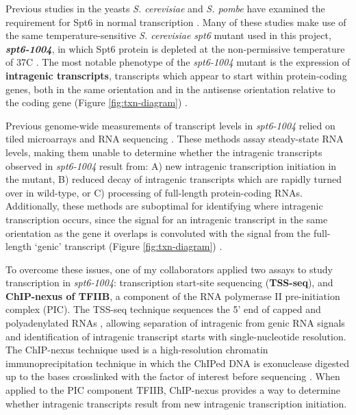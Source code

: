 \documentclass[9pt, letterpaper]{article}
\begin{document}
Previous studies in the yeasts \textit{S. cerevisiae} and \textit{S. pombe} have examined the requirement for Spt6 in normal transcription \cite{cheung2008, degennaro2013, kaplan2003, pathak2018, uwimana2017, vanbakel2013}. Many of these studies make use of the same temperature-sensitive \textit{S. cerevisiae} \textit{spt6} mutant used in this project, \textbf{\textit{spt6-1004}}, in which Spt6 protein is depleted at the non-permissive temperature of 37\textdegree C \cite{kaplan2003}. The most notable phenotype of the \textit{spt6-1004} mutant is the expression of \textbf{intragenic transcripts}, transcripts which appear to start within protein-coding genes, both in the same orientation and in the antisense orientation relative to the coding gene (Figure \ref{fig:txn-diagram}) \cite{cheung2008, degennaro2013, kaplan2003, uwimana2017}.

Previous genome-wide measurements of transcript levels in \textit{spt6-1004} relied on tiled microarrays \cite{cheung2008} and RNA sequencing \cite{uwimana2017}. These methods assay steady-state RNA levels, making them unable to determine whether the intragenic transcripts observed in \textit{spt6-1004} result from: A) new intragenic transcription initiation in the mutant, B) reduced decay of intragenic transcripts which are rapidly turned over in wild-type, or C) processing of full-length protein-coding RNAs. Additionally, these methods are suboptimal for identifying where intragenic transcription occurs, since the signal for an intragenic transcript in the same orientation as the gene it overlaps is convoluted with the signal from the full-length `genic' transcript (Figure \ref{fig:txn-diagram}) \cite{cheung2008, lickwar2009}.

To overcome these issues, one of my collaborators applied two assays to study transcription in \textit{spt6-1004}: transcription start-site sequencing (\textbf{TSS-seq}), and \textbf{ChIP-nexus of TFIIB}, a component of the RNA polymerase II pre-initiation complex (PIC). The TSS-seq technique sequences the 5' end of capped and polyadenylated RNAs \cite{arribere2013, malabat2015}, allowing separation of intragenic from genic RNA signals and identification of intragenic transcript starts with single-nucleotide resolution. The ChIP-nexus technique used is a high-resolution chromatin immunoprecipitation technique in which the ChIPed DNA is exonuclease digested up to the bases crosslinked with the factor of interest before sequencing \cite{he2015}. When applied to the PIC component TFIIB, ChIP-nexus provides a way to determine whether intragenic transcripts result from new intragenic transcription initiation.
\end{document}
